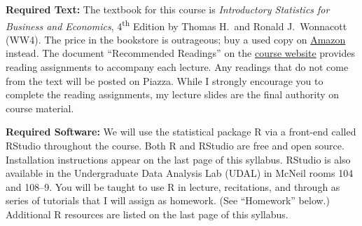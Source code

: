 \documentclass[11pt, letterpaper]{article}
\begin{document}
\medskip

\noindent \textbf{Required Text:} 
The textbook for this course is \emph{Introductory Statistics for Business and Economics}, 4\textsuperscript{th} Edition by Thomas H.\ and Ronald J.\ Wonnacott (WW4). 
The price in the bookstore is outrageous; buy a used copy on \href{http://tinyurl.com/ECON103-2013A}{Amazon} instead. 
The document ``Recommended Readings'' on the \href{http://ditraglia.com/Econ103Public}{course website} provides reading assignments to accompany each lecture.
Any readings that do not come from the text will be posted on Piazza.
While I strongly encourage you to complete the reading assignments, my lecture slides are the final authority on course material.

\medskip


%


\noindent \textbf{Required Software:} 
We will use the statistical package R via a front-end called RStudio throughout the course. 
Both R and RStudio are free and open source. Installation instructions appear on the last page of this syllabus.
RStudio is also available in the Undergraduate Data Analysis Lab (UDAL) in McNeil rooms 104 and 108--9. 
You will be taught to use R in lecture, recitations, and through as series of tutorials that I will assign as homework. (See ``Homework'' below.)  
Additional R resources are listed on the last page of this syllabus.
\end{document}
